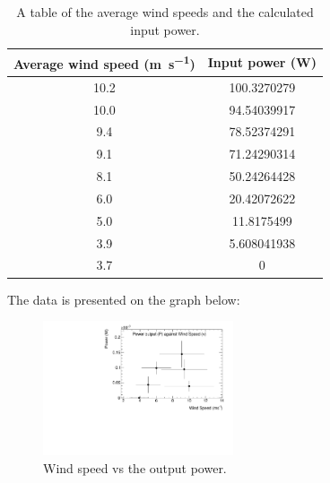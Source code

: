 \documentclass[12pt]{article}
\begin{document}
\begin{table}[h]
  \centering
  \begin{tabular}{@{}cc@{}} \toprule
    Average wind speed (\si{\metre\per\second}) & Input power (\si{\watt}) \\ \midrule
    10.2 & 100.3270279 \\
    10.0 & 94.54039917 \\
    9.4 & 78.52374291 \\
    9.1 & 71.24290314 \\
    8.1 & 50.24264428 \\
    6.0 & 20.42072622 \\
    5.0 & 11.8175499 \\
    3.9 & 5.608041938 \\
    3.7 & 0 \\ \bottomrule
\end{tabular}
\caption{A table of the average wind speeds and the calculated input power.}
\label{table:WindSpeedVsPower}
\end{table}

The data is presented on the graph below:

\begin{figure}[h]
  \centering
  \includegraphics[width=0.5\textwidth]{img/PowerVsWind.pdf}
  \caption{Wind speed vs the output power.}
  \label{figure:final}
\end{figure}
\end{document}
